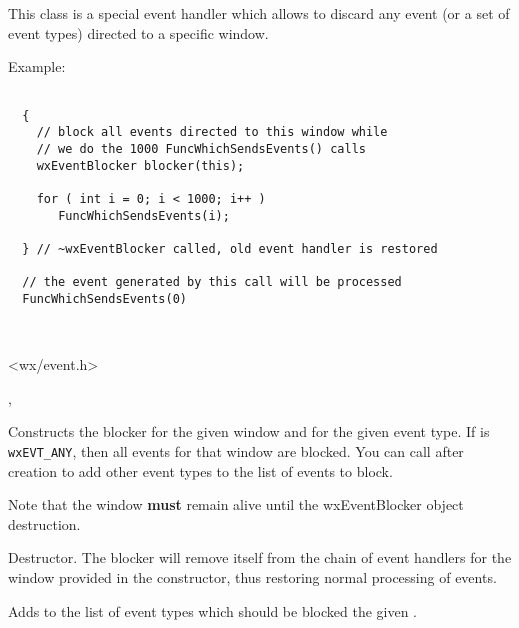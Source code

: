 \section{}\label{wxeventblocker}

This class is a special event handler which allows to discard
any event (or a set of event types) directed to a specific window.

Example:

\begin{verbatim}

  {
    // block all events directed to this window while
    // we do the 1000 FuncWhichSendsEvents() calls
    wxEventBlocker blocker(this);

    for ( int i = 0; i < 1000; i++ )
       FuncWhichSendsEvents(i);

  } // ~wxEventBlocker called, old event handler is restored

  // the event generated by this call will be processed
  FuncWhichSendsEvents(0)
\end{verbatim}



\\


<wx/event.h>


,



\label{wxeventblockerctor}


Constructs the blocker for the given window and for the given event type.
If  is \texttt{wxEVT\_ANY}, then all events for that window are
blocked. You can call  after creation to
add other event types to the list of events to block.

Note that the  window \textbf{must} remain alive until the
wxEventBlocker object destruction.


\label{wxeventblockerdtor}


Destructor. The blocker will remove itself from the chain of event handlers for
the window provided in the constructor, thus restoring normal processing of
events.


\label{wxeventblockerblock}


Adds to the list of event types which should be blocked the given .


